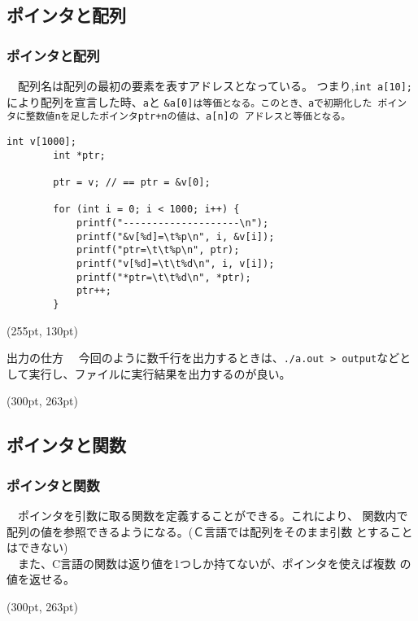 \documentclass[dvipdfmx]{beamer}
\begin{document}
\subsection{ポインタと配列}
\begin{frame}[t, fragile]
    \frametitle{ポインタと配列}
    　配列名は配列の最初の要素を表すアドレスとなっている。
    つまり,\texttt{int a[10];}により配列を宣言した時、\texttt{a}と
    \verb|&|\texttt{a[0]は等価となる。このとき、aで初期化した
    ポインタに整数値nを足したポインタptr+nの値は、a[n]の
    アドレスと等価となる。}
    \begin{lstlisting}[gobble=8, caption=Exercise]
        int v[1000];
        int *ptr;

        ptr = v; // == ptr = &v[0];

        for (int i = 0; i < 1000; i++) {
            printf("--------------------\n");
            printf("&v[%d]=\t%p\n", i, &v[i]);
            printf("ptr=\t\t%p\n", ptr);
            printf("v[%d]=\t\t%d\n", i, v[i]);
            printf("*ptr=\t\t%d\n", *ptr);
            ptr++;
        }
    \end{lstlisting}
    \begin{textblock*}{0.3\linewidth}(255pt, 130pt)
        \begin{itembox}[l]{出力の仕方}
            　今回のように数千行を出力するときは、\texttt{./a.out > output}などとして実行し、ファイルに実行結果を出力するのが良い。
        \end{itembox}
    \end{textblock*}
    \begin{textblock*}{0.3\linewidth}(300pt, 263pt)
        \space
    \end{textblock*}
\end{frame}

\subsection{ポインタと関数}
\begin{frame}[c, fragile]
    \frametitle{ポインタと関数}
    　ポインタを引数に取る関数を定義することができる。これにより、
    関数内で配列の値を参照できるようになる。(\textrm{Ｃ}言語では配列をそのまま引数
    とすることはできない)\\
    　また、\textrm{C}言語の関数は返り値を1つしか持てないが、ポインタを使えば複数
    の値を返せる。
    \begin{textblock*}{0.3\linewidth}(300pt, 263pt)
        \space
    \end{textblock*}
\end{frame}
\end{document}
